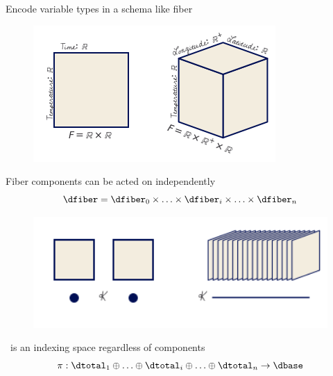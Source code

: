 \documentclass[xcolor={dvipsnames}, handout]{beamer}
\begin{document}
\begin{frame}{Encode variable types in a schema like fiber \cite{spivakDatabasesAreCategories2010,spivakSIMPLICIALDATABASES}}
    \begin{figure}[H]
        \centering
        \includegraphics[height=.5\textwidth]{figures/math/fiber.png}
        \label{fig:data_fiber_example}
    \end{figure}
    \begin{block}{Fiber components can be acted on independently}
        \begin{equation}
            \dfiber = \dfiber_0 \times \ldots \times \dfiber_i \times \ldots \times \dfiber_n
        \end{equation}
    \end{block}
\end{frame}


\begin{frame}{}
    \begin{figure}[H]
        \includegraphics[width=1\textwidth]{figures/math/base.png}
        \caption{}
        \label{fig:base_example}
    \end{figure}
    \begin{block}{\dbase\ is an indexing space regardless of components}
        \begin{equation}
            \pi:\dtotal_1\oplus\ldots\oplus \dtotal_i \oplus\ldots \oplus \dtotal_n \rightarrow \dbase
        \end{equation}
    \end{block}
\end{frame}
\end{document}
